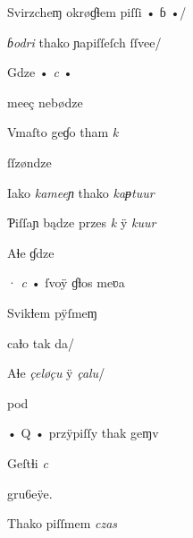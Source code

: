 \fullverselines

 \textit{} Svirzcheɱ okrøɠɬem piſſi • ɓ •/


\splitverse

\textit{ɓodri} thako ɲapiſſeſch ſſvee/


\indentVerse Gdze • \textit{c} • 


\splitverse

 meeç nebødze

\indentVerse Vmaſto geɠo tham \textit{k} 


\splitverse

ſſzøndze

\indentVerse Iako \textit{kameeɲ} thako \textit{kaᵽtuur} 

\newpage

\splitverse

Ƥiſſaɲ bądze przes \textit{k} ÿ \textit{kuur}

\indentVerse Aɬe ɠdze 


\splitverse

· \textit{c} • ſvoÿ ɠƚos meʋa

\indentVerse Svikƚem pÿſmeɱ  


\splitverse

caƚo tak da/

\indentVerse Aɬe \textit{çeløçu} ÿ \textit{çalu}/

\indentVerse  pod


\splitverse

  • Q • przÿpiſſy thak geɱv

\indentVerse Geſtɬi \textit{c}  


\newverseline {} gru6eÿe.

\indentVerse Thako piſſmem \textit{czas} 

